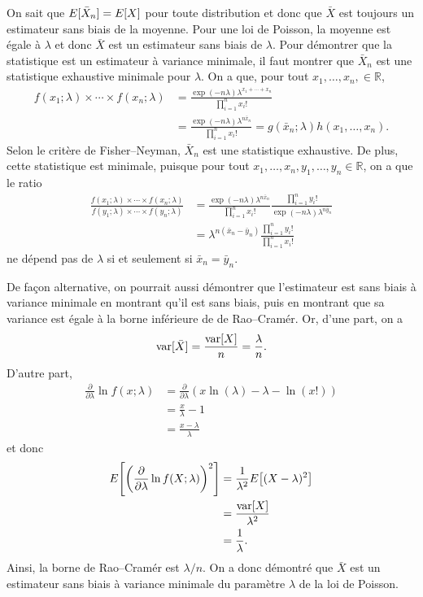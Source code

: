 \begin{solution}{3.18}
    On sait que $E [ \bar{X}_n ] = E [ X ]$ pour toute distribution et
    donc que $\bar{X}$ est toujours un estimateur sans biais de la
    moyenne. Pour une loi de Poisson, la moyenne est égale à $\lambda$
    et donc $\bar{X}$ est un estimateur sans biais de $\lambda$. Pour
    démontrer que la statistique est un estimateur à variance
    minimale, il faut montrer que $\bar{X}_n$ est une statistique exhaustive minimale pour $\lambda$. On a que, pour tout $x_1,\ldots,x_n, \in\mathbb{R}$,
    \begin{align*}
    f(x_1;\lambda)\times\cdots\times f(x_n;\lambda) & =  \frac{\exp(-n\lambda)\lambda^{x_1+\cdots+x_n}}{\prod_{i=1}^n x_i !} \\
    &= \frac{\exp(-n\lambda)\lambda^{n \bar{x}_n}}{\prod_{i=1}^n x_i !} = g(\bar{x}_n; \lambda)h(x_1,\ldots,x_n).
    \end{align*}
    Selon le critère de Fisher--Neyman, $\bar{X}_n$ est une statistique exhaustive. De plus, cette statistique est minimale, puisque pour tout $x_1,\ldots,x_n,y_1,\ldots,y_n \in\mathbb{R}$, on a que le ratio
    \begin{align*}
    \frac{f(x_1;\lambda)\times\cdots\times f(x_n;\lambda)}{f(y_1;\lambda)\times\cdots\times f(y_n;\lambda)}
    &= \frac{\exp(-n\lambda)\lambda^{n \bar{x}_n}}{\prod_{i=1}^n x_i !} \frac{\prod_{i=1}^n y_i !}{\exp(-n\lambda)\lambda^{n \bar{y}_n}} \\
&= \lambda^{n (\bar{x}_n- \bar{y}_n)} \frac{\prod_{i=1}^n y_i !}{\prod_{i=1}^n x_i !}
    \end{align*}
    ne dépend pas de $\lambda$ si et seulement si $\bar{x}_n=\bar{y}_n$.

    De façon alternative, on pourrait aussi démontrer que l'estimateur est sans biais à variance minimale en montrant qu'il est sans biais, puis en montrant que sa variance est égale à la borne inférieure de
    de Rao--Cramér. Or, d'une part, on a
    \begin{equation*}
      \mathrm{var} [ \bar{X} ] = \frac{\mathrm{var} [ X ]}{n} = \frac{\lambda}{n}.
    \end{equation*}
    D'autre part,
    \begin{align*}
      \frac{\partial}{\partial \lambda} \ln f(x; \lambda)
      &= \frac{\partial}{\partial \lambda}
      (x \ln(\lambda) - \lambda - \ln(x!)) \\
      &= \frac{x}{\lambda} - 1 \\
      &= \frac{x - \lambda}{\lambda}
    \end{align*}
    et donc
    \begin{align*}
      E\! \left[ \left( \frac{\partial}{\partial \lambda}
          \ln f(X; \lambda) \right)^2 \right]
      &= \frac{1}{\lambda^2}E\! \left[ (X - \lambda)^2 \right] \\
      &= \frac{\mathrm{var}\! \left[ X \right]}{\lambda^2} \\
      &= \frac{1}{\lambda}.
    \end{align*}
    Ainsi, la borne de Rao--Cramér est $\lambda/n$. On a donc démontré
    que $\bar{X}$ est un estimateur sans biais à variance minimale du
    paramètre $\lambda$ de la loi de Poisson.
  
\end{solution}
